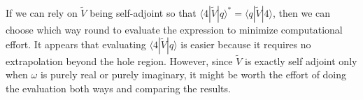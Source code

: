 \documentclass[12pt]{article}
\def\ket#1{|#1\rangle}
\def\bra#1{\langle#1}
\begin{document}
If we can rely on $\tilde V$ being self-adjoint so that
$\bra{4}|\tilde{V}\ket{q}^*=\bra{q}|\tilde{V}\ket{4}$, then we can
choose which way round to evaluate the expression to minimize
computational effort. It appears that evaluating
$\bra{4}|\tilde{V}\ket{q}$ is easier because it requires no
extrapolation beyond the hole region. However, since $\tilde V$ is
exactly self adjoint only when $\omega$ is purely real or purely
imaginary, it might be worth the effort of doing the evaluation both
ways and comparing the results.
\end{document}
